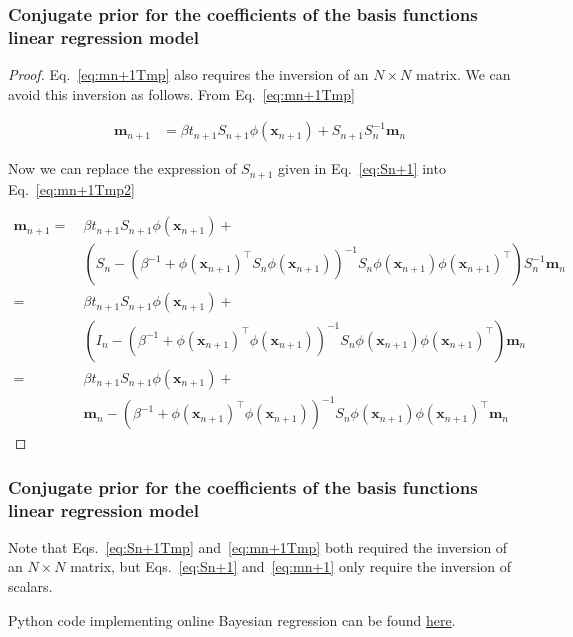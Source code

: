 \documentclass[11pt]{beamer}
\begin{document}
\begin{frame}
    \frametitle{Conjugate prior for the coefficients of the basis functions
    linear regression model}

    \scriptsize
    \begin{proof}
        Eq.~\ref{eq:mn+1Tmp} also requires the inversion of an $N\times N$
        matrix. We can avoid this inversion as follows. From
        Eq.~\ref{eq:mn+1Tmp}

        \begin{align}
            \mathbf{m}_{n+1}&=\beta t_{n+1}S_{n+1}\phi(\mathbf{x}_{n+1})+S_{n+1}S_n^{-1}\mathbf{m}_n\label{eq:mn+1Tmp2}
        \end{align}

        Now we can replace the expression of $S_{n+1}$ given in
        Eq.~\ref{eq:Sn+1} into
        Eq.~\ref{eq:mn+1Tmp2}

        \begin{align*}
            \mathbf{m}_{n+1}=\ &\beta t_{n+1}S_{n+1}\phi(\mathbf{x}_{n+1})+\\
                               &(S_n-(\beta^{-1}+\phi(\mathbf{x}_{n+1})^\intercal S_n\phi(\mathbf{x}_{n+1}))^{-1}S_n\phi(\mathbf{x}_{n+1})\phi(\mathbf{x}_{n+1})^\intercal)S_n^{-1}\mathbf{m}_n\\
                            =\ &\beta t_{n+1}S_{n+1}\phi(\mathbf{x}_{n+1})+\\
                               &(I_n-(\beta^{-1}+\phi(\mathbf{x}_{n+1})^\intercal \phi(\mathbf{x}_{n+1}))^{-1}S_n\phi(\mathbf{x}_{n+1})\phi(\mathbf{x}_{n+1})^\intercal)\mathbf{m}_n\\
                            =\ &\beta t_{n+1}S_{n+1}\phi(\mathbf{x}_{n+1})+\\
                               &\mathbf{m}_n-(\beta^{-1}+\phi(\mathbf{x}_{n+1})^\intercal \phi(\mathbf{x}_{n+1}))^{-1}S_n\phi(\mathbf{x}_{n+1})\phi(\mathbf{x}_{n+1})^\intercal\mathbf{m}_n
        \end{align*}

    \end{proof}
    \normalsize
\end{frame}

\begin{frame}
    \frametitle{Conjugate prior for the coefficients of the basis functions
    linear regression model}

    \scriptsize
    Note that Eqs.~\ref{eq:Sn+1Tmp} and~\ref{eq:mn+1Tmp} both required the inversion
    of an $N\times N$ matrix, but Eqs.~\ref{eq:Sn+1} and~\ref{eq:mn+1} only
    require the inversion of scalars.

    \vspace{0.3in}

    Python code implementing online Bayesian regression can be found
    \href{https://joacorapela.github.io/gcnuBridging2023/auto\_examples/bayesianLinearRegression/plotOnlineBayesianLinearRegression.html\#sphx-glr-auto-examples-bayesianlinearregression-plotonlinebayesianlinearregression-py}{here}.

    \normalsize

\end{frame}
\end{document}
